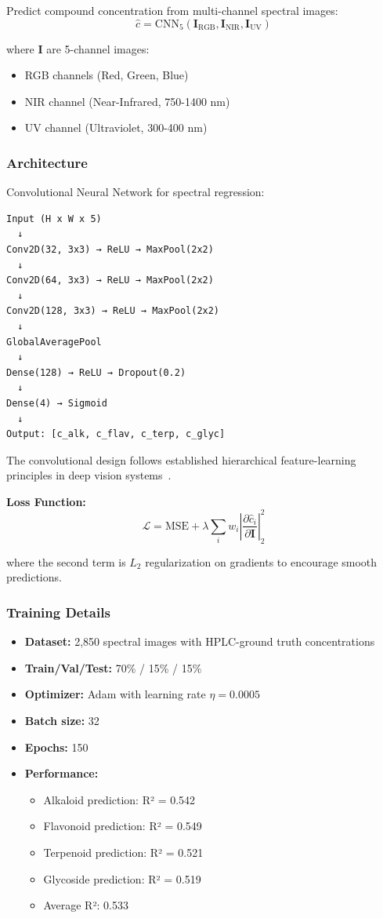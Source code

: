 \documentclass[11pt,a4paper]{article}
\begin{document}
Predict compound concentration from multi-channel spectral images:
\[
\hat{c} = \text{CNN}_5(\mathbf{I}_{\text{RGB}}, \mathbf{I}_{\text{NIR}}, \mathbf{I}_{\text{UV}})
\]

where $\mathbf{I}$ are 5-channel images:
\begin{itemize}
    \item RGB channels (Red, Green, Blue)
    \item NIR channel (Near-Infrared, 750-1400 nm)
    \item UV channel (Ultraviolet, 300-400 nm)
\end{itemize}

\subsubsection{Architecture}

Convolutional Neural Network for spectral regression:

\begin{verbatim}
Input (H x W x 5) 
  ↓
Conv2D(32, 3x3) → ReLU → MaxPool(2x2)
  ↓
Conv2D(64, 3x3) → ReLU → MaxPool(2x2)
  ↓
Conv2D(128, 3x3) → ReLU → MaxPool(2x2)
  ↓
GlobalAveragePool
  ↓
Dense(128) → ReLU → Dropout(0.2)
  ↓
Dense(4) → Sigmoid
  ↓
Output: [c_alk, c_flav, c_terp, c_glyc]
\end{verbatim}

The convolutional design follows established hierarchical feature-learning principles in deep vision systems~\cite{krizhevsky2012,goodfellow2016}.

\textbf{Loss Function:}
\[
\mathcal{L} = \text{MSE} + \lambda \sum_{i} w_i \left|\frac{\partial \hat{c}_i}{\partial \mathbf{I}}\right|_2^2
\]

where the second term is $L_2$ regularization on gradients to encourage smooth predictions.

\subsubsection{Training Details}

\begin{itemize}
    \item \textbf{Dataset:} 2,850 spectral images with HPLC-ground truth concentrations
    \item \textbf{Train/Val/Test:} 70\% / 15\% / 15\%
    \item \textbf{Optimizer:} Adam with learning rate $\eta = 0.0005$
    \item \textbf{Batch size:} 32
    \item \textbf{Epochs:} 150
    \item \textbf{Performance:}
    \begin{itemize}
        \item Alkaloid prediction: R² = 0.542
        \item Flavonoid prediction: R² = 0.549
        \item Terpenoid prediction: R² = 0.521
        \item Glycoside prediction: R² = 0.519
        \item Average R²: 0.533
    \end{itemize}
\end{itemize}
\end{document}
